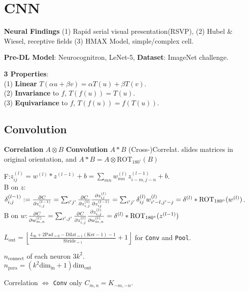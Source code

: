 \section{CNN}

\textbf{Neural Findings}
(1) Rapid serial visual presentation(RSVP), (2) Hubel \& Wiesel, receptive fields (3) HMAX Model, simple/complex cell.

\textbf{Pre-DL Model}: Neurocognitron, LeNet-5, \textbf{Dataset}: ImageNet challenge.

\textbf{3 Properties}:\\
(1) \textbf{Linear} \(T(\alpha {u}+\beta {v})=\alpha T({u})+\beta T({v})\).\\ (2) \textbf{Invariance} to \(f\), \(T(f({u}))=T({u})\).\\ (3) \textbf{Equivariance} to \(f\), \(T(f({u}))=f(T({u}))\).

\subsection*{Convolution}
\textbf{Correlation} $A \otimes B$  \textbf{Convolution} $A \ast B$
(Cross-)Correlat. slides matrices in original orientation, and $A \ast B = A \otimes \text{ROT}_{180^{\circ}}(B)$



\textsf{F}:\( z_{ij}^{(l)}=w^{(l)} * z^{(l-1)}+b= \sum_{mn} w_{mn}^{(l)} z_{i-m, j-n}^{(l-1)}+b\). \\
\textsf{B} on \(z\):\(\delta_{i,j}^{(l-1)} := \pdv{C}{z^{(l-1)}_{i,j}} = \sum_{i'j'} \pdv{C}{z^{(l)}_{i,j}} \pdv{z^{(l)}_{ij}}{z^{(l-1)}_{ij}} =  \sum_{i'j'} \delta_{ij}^{(l)} w_{i'-l,j'-j}^{(l)} = \delta^{(l)} * \text{ROT}_{180^{\circ}}(w^{(l)})\).\\
\textsf{B} on \(w\):\(\pdv{C}{w^{(l)}_{m,n}} =  \sum_{i',j'} \pdv{C}{z^{(l)}_{i,j}} \pdv{z^{(l)}_{i,j}}{w^{(l)}_{m,n}} =  \delta^{(l)} * \text{ROT}_{180^{\circ}}(z^{(l-1)})\)

\( L_{\text{out}}=\left\lfloor \frac{  L_{\text{in}} + 2\text{Pad}_{=0} - \text {Dilat}_{=1}(\text{Ker} - 1)-1 }{\text {Stride}_{=1}} + 1 \right\rfloor \) for \verb|Conv| and \verb|Pool|.

\(n_{\text{connect}}\) of each neuron \(3k^2\).\\
\(n_{\text{para}} = ( k^2 \text{dim}_{\text{in}} + 1)\text{dim}_{\text{out}}\)

Correlation \(\Leftrightarrow\) \verb|Conv| only \(C_{m,n} = K_{-m,-n}\).

